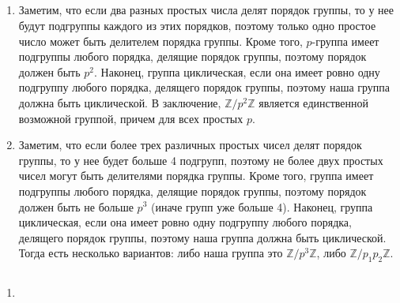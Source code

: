 		\subsection{}
		\begin{enumerate}
			\item Заметим, что если два разных простых числа делят порядок группы, то у нее будут подгруппы каждого из этих порядков, поэтому только одно простое число может быть делителем порядка группы. Кроме того, $p$-группа имеет подгруппы любого порядка, делящие порядок группы, поэтому порядок должен быть $p^2$. Наконец, группа циклическая, если она имеет ровно одну подгруппу любого порядка, делящего порядок группы, поэтому наша группа должна быть циклической. В заключение, $\mathbb{Z} \slash p^2 \mathbb{Z}$ является единственной возможной группой, причем для всех простых $p$.
			\\
			\item Заметим, что если более трех различных простых чисел делят порядок группы, то у нее будет больше 4 подгрупп, поэтому не более двух простых чисел могут быть делителями порядка группы. Кроме того, группа имеет подгруппы любого порядка, делящие порядок группы, поэтому порядок должен быть не больше $p^3$ (иначе групп уже больше 4). Наконец, группа циклическая, если она имеет ровно одну подгруппу любого порядка, делящего порядок группы, поэтому наша группа должна быть циклической. Тогда есть несколько вариантов: либо наша группа это $\mathbb{Z} \slash p^3 \mathbb{Z}$, либо $\mathbb{Z} \slash p_1 p_2 \mathbb{Z}$.
		\end{enumerate}
		
		\subsection{}
		
		\subsection{}
		\begin{enumerate}
			\item
		\end{enumerate}
		
